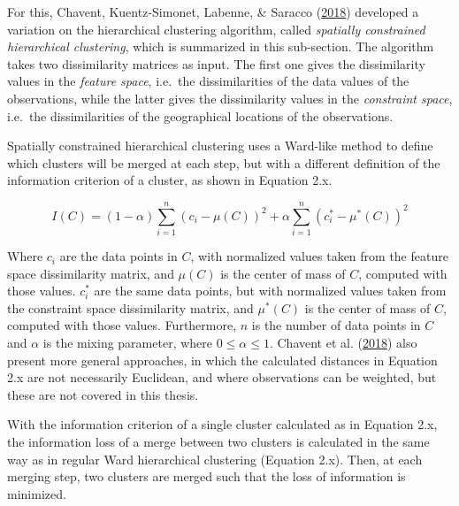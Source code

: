 \documentclass[12pt,oneside]{reedthesis}
\begin{document}
For this, Chavent, Kuentz-Simonet, Labenne, \& Saracco
(\protect\hyperlink{ref-clustgeo}{2018}) developed a variation on the
hierarchical clustering algorithm, called \emph{spatially constrained
hierarchical clustering}, which is summarized in this sub-section. The
algorithm takes two dissimilarity matrices as input. The first one gives
the dissimilarity values in the \emph{feature space}, i.e.~the
dissimilarities of the data values of the observations, while the latter
gives the dissimilarity values in the \emph{constraint space}, i.e.~the
dissimilarities of the geographical locations of the observations.

Spatially constrained hierarchical clustering uses a Ward-like method to
define which clusters will be merged at each step, but with a different
definition of the information criterion of a cluster, as shown in
Equation 2.x.

\[ 
I(C) = 
(1-\alpha)\sum_{i=1}^{n}(c_{i} - \mu(C))^{2} +
\alpha\sum_{i=1}^{n}(c_{i}^{*} - \mu^{*}(C))^{2}
\]

Where \(c_{i}\) are the data points in \(C\), with normalized values
taken from the feature space dissimilarity matrix, and \(\mu(C)\) is the
center of mass of \(C\), computed with those values. \(c_{i}^{*}\) are
the same data points, but with normalized values taken from the
constraint space dissimilarity matrix, and \(\mu^{*}(C)\) is the center
of mass of \(C\), computed with those values. Furthermore, \(n\) is the
number of data points in \(C\) and \(\alpha\) is the mixing parameter,
where \(0 \leq \alpha \leq 1\). Chavent et al.
(\protect\hyperlink{ref-clustgeo}{2018}) also present more general
approaches, in which the calculated distances in Equation 2.x are not
necessarily Euclidean, and where observations can be weighted, but these
are not covered in this thesis.

With the information criterion of a single cluster calculated as in
Equation 2.x, the information loss of a merge between two clusters is
calculated in the same way as in regular Ward hierarchical clustering
(Equation 2.x). Then, at each merging step, two clusters are merged such
that the loss of information is minimized.
\end{document}

